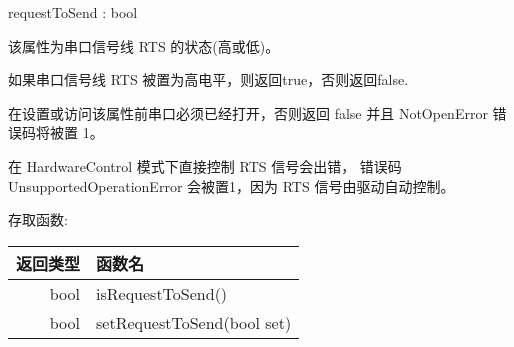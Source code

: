 requestToSend : bool

该属性为串口信号线 RTS 的状态(高或低)。

如果串口信号线 RTS 被置为高电平，则返回true，否则返回false.

\begin{notice}
在设置或访问该属性前串口必须已经打开，否则返回 false 并且 NotOpenError 错误码将被置 1。
\end{notice}

\begin{notice}
在 HardwareControl 模式下直接控制 RTS 信号会出错， 错误码 UnsupportedOperationError 会被置1，因为 RTS 信号由驱动自动控制。
\end{notice}

存取函数:

\begin{tabular}{|r|l|}
\hline
返回类型 &	函数名 \\ 
\hline
bool &	isRequestToSend() \\ 
\hline
bool 	& setRequestToSend(bool set) \\ 
\hline
\end{tabular}